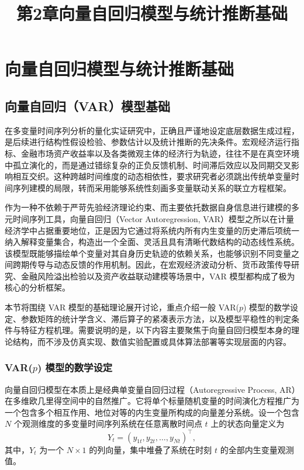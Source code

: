 \documentclass[UTF8,a4paper,12pt]{ctexbook}
\title{第2章\quad 向量自回归模型与统计推断基础}
\author{}
\date{}
\begin{document}
\maketitle

\setcounter{chapter}{1}
\chapter{向量自回归模型与统计推断基础}

\section{向量自回归（VAR）模型基础}

在多变量时间序列分析的量化实证研究中，正确且严谨地设定底层数据生成过程，是后续进行结构性假设检验、参数估计以及统计推断的先决条件。宏观经济运行指标、金融市场资产收益率以及各类微观主体的经济行为轨迹，往往不是在真空环境中孤立演化的，而是通过错综复杂的正负反馈机制、时间滞后效应以及同期交叉影响相互交织。这种跨越时间维度的动态相依性，要求研究者必须跳出传统单变量时间序列建模的局限，转而采用能够系统性刻画多变量联动关系的联立方程框架。

作为一种不依赖于严苛先验经济理论约束、而主要依托数据自身信息进行建模的多元时间序列工具，向量自回归（Vector Autoregression, VAR）模型之所以在计量经济学中占据重要地位，正是因为它通过将系统内所有内生变量的历史滞后项统一纳入解释变量集合，构造出一个全面、灵活且具有清晰代数结构的动态线性系统。该模型既能够描绘单个变量对其自身历史轨迹的依赖关系，也能够识别不同变量之间跨期传导与动态反馈的作用机制。因此，在宏观经济波动分析、货币政策传导研究、金融风险溢出检验以及资产收益联动建模等场景中，VAR 模型都构成了极为核心的分析框架。

本节将围绕 VAR 模型的基础理论展开讨论，重点介绍一般 VAR($p$) 模型的数学设定、参数矩阵的统计学含义、滞后算子的紧凑表示方法，以及模型平稳性的判定条件与特征方程机理。需要说明的是，以下内容主要聚焦于向量自回归模型本身的理论结构，而不涉及仿真实现、数值实验配置或具体算法部署等实现层面的内容。

\subsection{VAR($p$) 模型的数学设定}

向量自回归模型在本质上是经典单变量自回归过程（Autoregressive Process, AR）在多维欧几里得空间中的自然推广。它将单个标量随机变量的时间演化方程推广为一个包含多个相互作用、地位对等的内生变量所构成的向量差分系统。设一个包含 $N$ 个观测维度的多变量时间序列系统在任意离散时间点 $t$ 上的状态向量定义为
\begin{equation}
Y_t=(y_{1t},y_{2t},\dots,y_{Nt})^\top,
\end{equation}
其中，$Y_t$ 为一个 $N\times 1$ 的列向量，集中堆叠了系统在时刻 $t$ 的全部内生变量观测值。
\end{document}
